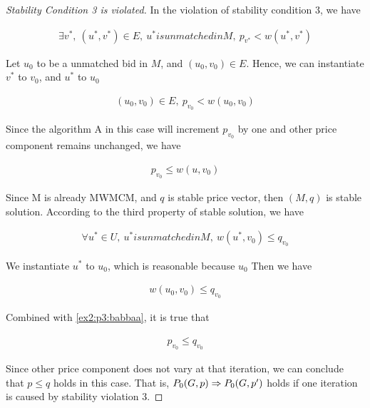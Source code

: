 \documentclass[11pt,a4paper]{article}
\begin{document}
\begin{proof}[Stability Condition 3 is violated]

    In the violation of stability condition 3, we have

    \begin{align}
        \exists v^{*},\ (u^{*}, v^{*}) \in E,\ u^{*} is unmatched in M,\ p_{v^{*}} < w(u^{*}, v^{*})
    \end{align}

    Let $u_0$ to be a unmatched bid in $M$, and $(u_0, v_0) \in E$. 
    Hence, we can instantiate $v^{*}$ to $v_0$, and $u^{*}$ to $u_0$

    \begin{align}
        (u_0, v_0) \in E,\ p_{v_0} < w(u_0, v_0)
    \end{align}
    
    Since the algorithm A in this case will increment $p_{v_0}$ by one and other
    price component remains unchanged, we have

    \begin{align} \label{ex2:p3:babbaa}
        p_{v_0} \leq w(u, v_0)
    \end{align}

    Since M is already MWMCM, and $q$ is stable price vector, then $(M, q)$ is
    stable solution. According to the third property of stable solution, we
    have

    \begin{align}
        \forall u^{*} \in U,\ u^{*} is unmatched in M,\ w(u^{*}, v_0) \leq q_{v_0}
    \end{align}

    We instantiate $u^{*}$ to $u_0$, which is reasonable because $u_0$ Then we have

    \begin{align}
        w(u_0, v_0) \leq q_{v_0}
    \end{align}

    Combined with \eqref{ex2:p3:babbaa}, it is true that

    \begin{align}
        p_{v_0} \leq q_{v_0}
    \end{align}

    Since other price component does not vary at that iteration, we can
    conclude that $p \leq q$ holds in this case. That is, $ P_0(G, p) \Rightarrow
    P_0(G, p') $ holds if one iteration is caused by stability violation 3.

\end{proof}
\end{document}
